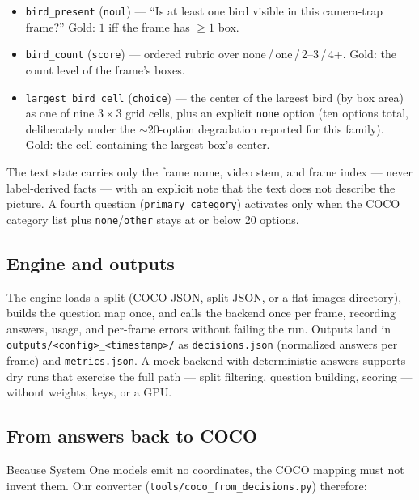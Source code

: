 \documentclass[11pt]{article}
\newcommand{\code}[1]{\texttt{#1}}
\newcommand{\sone}{System One}
\begin{document}
\begin{itemize}
  \item \code{bird\_present} (\code{noul}) --- ``Is at least one bird visible
        in this camera-trap frame?'' Gold: $1$ iff the frame has $\ge 1$ box.
  \item \code{bird\_count} (\code{score}) --- ordered rubric over
        none\,/\,one\,/\,2--3\,/\,4+. Gold: the count level of the frame's boxes.
  \item \code{largest\_bird\_cell} (\code{choice}) --- the center of the
        largest bird (by box area) as one of nine $3\times3$ grid cells, plus
        an explicit \code{none} option (ten options total, deliberately under
        the $\sim$20-option degradation reported for this family). Gold: the
        cell containing the largest box's center.
\end{itemize}

The text state carries only the frame name, video stem, and frame index ---
never label-derived facts --- with an explicit note that the text does not
describe the picture. A fourth question (\code{primary\_category}) activates
only when the COCO category list plus \code{none}/\code{other} stays at or
below 20 options.

\subsection{Engine and outputs}

The engine loads a split (COCO JSON, split JSON, or a flat images directory),
builds the question map once, and calls the backend once per frame, recording
answers, usage, and per-frame errors without failing the run. Outputs land in
\code{outputs/<config>\_<timestamp>/} as \code{decisions.json} (normalized
answers per frame) and \code{metrics.json}. A mock backend with deterministic
answers supports dry runs that exercise the full path --- split filtering,
question building, scoring --- without weights, keys, or a GPU.

\subsection{From answers back to COCO}
\label{sec:coco}

Because \sone{} models emit no coordinates, the COCO mapping must not invent
them. Our converter (\code{tools/coco\_from\_decisions.py}) therefore:
\end{document}
